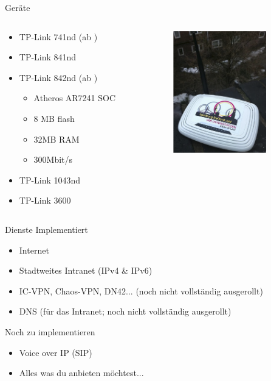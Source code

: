 \documentclass[c]{beamer}
\begin{document}
\begin{frame}{Geräte}
	\begin{columns}[c]
		\begin{column}{0.5\textwidth}
			\begin{itemize}
				\item TP-Link 741nd (ab )
				\item TP-Link 841nd
				\item TP-Link 842nd (ab )
				\begin{itemize}
					\item Atheros AR7241 SOC
					\item 8 MB flash	
					\item 32MB RAM
					\item 300Mbit/s
				\end{itemize}
				\item TP-Link 1043nd
				\item TP-Link 3600
			\end{itemize}
		\end{column}
		\begin{column}{0.5\textwidth}
			\begin{center}
				\includegraphics[height=150pt]{741nd}
			\end{center}
		\end{column}
	\end{columns}
\end{frame}


\begin{frame}{Dienste}
	Implementiert
	\begin{itemize}
		\item Internet
		\item Stadtweites Intranet (IPv4 \& IPv6)
		\item IC-VPN, Chaos-VPN, DN42... (noch nicht vollständig ausgerollt)
		\item DNS (für das Intranet; noch nicht vollständig ausgerollt)
	\end{itemize}
	Noch zu implementieren
	\begin{itemize}
		\item Voice over IP (SIP)
		\item Alles was du anbieten möchtest...
	\end{itemize}
\end{frame}
\end{document}
